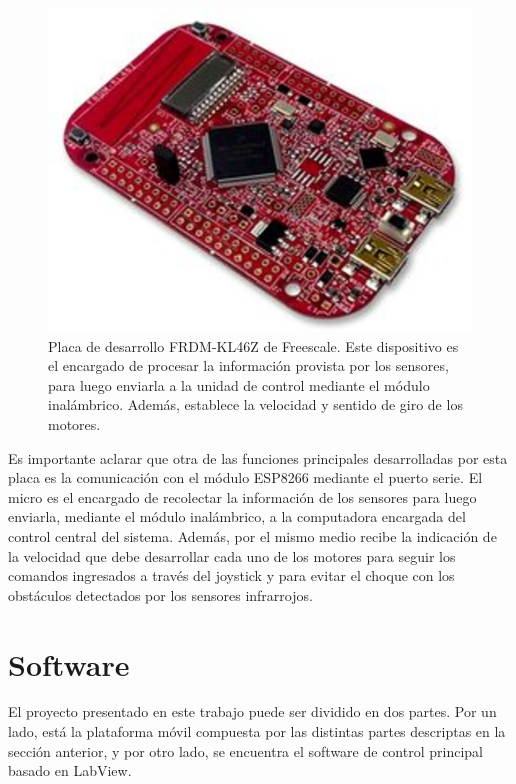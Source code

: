 \documentclass[conference,a4paper,9pt]{IEEEtran}
\begin{document}
\begin{figure}[H]%
\centering\includegraphics[scale=1]{micro.eps}%
\caption{Placa de desarrollo FRDM-KL46Z de Freescale. Este dispositivo es el encargado de procesar la información provista por los sensores, para luego enviarla a la unidad de control mediante el módulo inalámbrico. Además, establece la velocidad y sentido de giro de los motores.}%
\label{micro}%
\end{figure}

Es importante aclarar que otra de las funciones principales desarrolladas por esta placa es la comunicación con el módulo ESP8266 mediante el puerto serie. El micro es el encargado de recolectar la información de los sensores para luego enviarla, mediante el módulo inalámbrico, a la computadora encargada del control central del sistema. Además, por el mismo medio recibe la indicación de la velocidad que debe desarrollar cada uno de los motores para seguir los comandos ingresados a través del joystick y para evitar el choque con los obstáculos detectados por los sensores infrarrojos.

\section{Software}

El proyecto presentado en este trabajo puede ser dividido en dos partes. Por un lado, está la plataforma móvil compuesta por las distintas partes descriptas en la sección anterior, y por otro lado, se encuentra el software de control principal basado en LabView.
\end{document}
